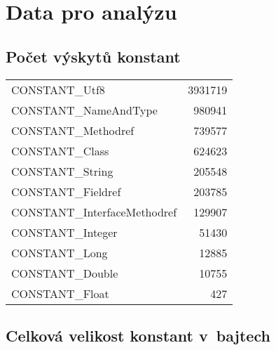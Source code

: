 
\chapter{Data pro analýzu}

\section{Počet výskytů konstant}\label{constf}

  \begin{tabular}{l r}
	CONSTANT\_Utf8	&	3931719	\\
	CONSTANT\_NameAndType	&	980941	\\
	CONSTANT\_Methodref	&	739577	\\
	CONSTANT\_Class	&	624623	\\
	CONSTANT\_String	&	205548	\\
	CONSTANT\_Fieldref	&	203785	\\
	CONSTANT\_InterfaceMethodref	&	129907	\\
	CONSTANT\_Integer	&	51430	\\
	CONSTANT\_Long	&	12885	\\
	CONSTANT\_Double	&	10755	\\
	CONSTANT\_Float	&	427  
  \end{tabular}

\section{Celková velikost konstant v~bajtech}\label{consts}

